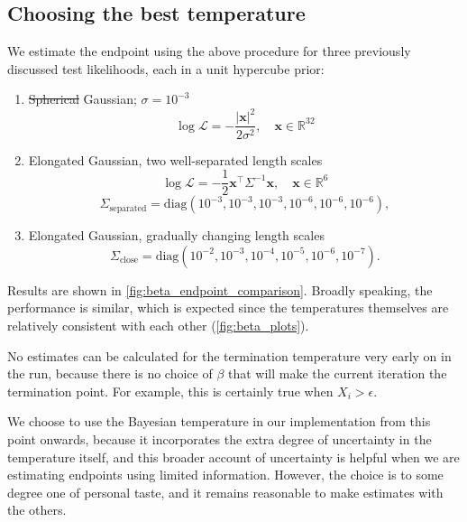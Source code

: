 \documentclass[usenatbib]{mnras}
\newcommand{\Like}{\mathcal{L}}
\providecommand{\DIFaddtex}[1]{{\protect\color{blue}\uwave{#1}}} %
\providecommand{\DIFdeltex}[1]{{\protect\color{red}\sout{#1}}}                      %
\providecommand{\DIFaddbegin}{} %
\providecommand{\DIFaddend}{} %
\providecommand{\DIFdelbegin}{} %
\providecommand{\DIFdelend}{} %
\providecommand{\DIFadd}[1]{\texorpdfstring{\DIFaddtex{#1}}{#1}} %
\providecommand{\DIFdel}[1]{\texorpdfstring{\DIFdeltex{#1}}{}} %
\newcommand{\DIFscaledelfig}{0.5}
\newlength{\DIFdelgraphicswidth} %
\newlength{\DIFdelgraphicsheight} %
\newcommand{\DIFaddincludegraphics}[2][]{{\color{blue}\fbox{\DIFOincludegraphics[#1]{#2}}}} %
\newcommand{\DIFdelincludegraphics}[2][]{%
\sbox{\DIFdelgraphicsbox}{\DIFOincludegraphics[#1]{#2}}%
\settoboxwidth{\DIFdelgraphicswidth}{\DIFdelgraphicsbox} %
\settoboxtotalheight{\DIFdelgraphicsheight}{\DIFdelgraphicsbox} %
\scalebox{\DIFscaledelfig}{%
\parbox[b]{\DIFdelgraphicswidth}{\usebox{\DIFdelgraphicsbox}\\[-\baselineskip] \rule{\DIFdelgraphicswidth}{0em}}\llap{\resizebox{\DIFdelgraphicswidth}{\DIFdelgraphicsheight}{%
\setlength{\unitlength}{\DIFdelgraphicswidth}%
\begin{picture}(1,1)%
\thicklines\linethickness{2pt} %
{\color[rgb]{1,0,0}\put(0,0){\framebox(1,1){}}}%
{\color[rgb]{1,0,0}\put(0,0){\line( 1,1){1}}}%
{\color[rgb]{1,0,0}\put(0,1){\line(1,-1){1}}}%
\end{picture}%
}\hspace*{3pt}}} %
} %
\DeclareRobustCommand{\DIFaddbegin}{\DIFOaddbegin \let\includegraphics\DIFaddincludegraphics} %
\DeclareRobustCommand{\DIFaddend}{\DIFOaddend \let\includegraphics\DIFOincludegraphics} %
\DeclareRobustCommand{\DIFdelbegin}{\DIFOdelbegin \let\includegraphics\DIFdelincludegraphics} %
\DeclareRobustCommand{\DIFdelend}{\DIFOaddend \let\includegraphics\DIFOincludegraphics} %
\begin{document}
\subsection{Choosing the best temperature}\label{sec:choosing_the_best_temperature}
We estimate the endpoint using the above procedure for three previously discussed test likelihoods, each in a unit hypercube prior:
\begin{enumerate}[leftmargin=*]
    \item \DIFdelbegin \DIFdel{Spherical }\DIFdelend \DIFaddbegin \DIFadd{Isotropic }\DIFaddend Gaussian; $\sigma = 10^{-3}$
        \begin{equation}
        \log \Like = -\frac{|\bm{x}|^2}{2\sigma^2}, \quad \bm{x} \in \mathbb{R}^{32}
        \end{equation}
    \item Elongated Gaussian, two well-separated length scales 
        \begin{equation}
            \log\Like = -\frac{1}{2} \bm{x}^\intercal \Sigma^{-1}\bm{x}, \quad \bm{x} \in \mathbb{R}^6
        \end{equation}
        \begin{equation*}
            \Sigma_\mathrm{separated} = \mathrm{diag}(10^{-3}, 10^{-3}, 10^{-3}, 10^{-6}, 10^{-6}, 10^{-6}),
        \end{equation*}
    \item Elongated Gaussian, gradually changing length scales
        \begin{equation}
            \Sigma_\mathrm{close} = \mathrm{diag}(10^{-2}, 10^{-3}, 10^{-4}, 10^{-5}, 10^{-6}, 10^{-7}).
        \end{equation}
\end{enumerate}
Results are shown in \cref{fig:beta_endpoint_comparison}. Broadly speaking, the performance is similar, which is expected since the temperatures themselves are relatively consistent with each other (\cref{fig:beta_plots}).
\par
No estimates can be calculated for the termination temperature very early on in the run, because there is no choice of $\beta$ that will make the current iteration the termination point. For example, this is certainly true when $X_i > \epsilon$.
\par
We choose to use the Bayesian temperature in our implementation from this point onwards, because it incorporates the extra degree of uncertainty in the temperature itself, and this broader account of uncertainty is helpful when we are estimating endpoints using limited information. However, the choice is to some degree one of personal taste, and it remains reasonable to make estimates with the others.
\end{document}

